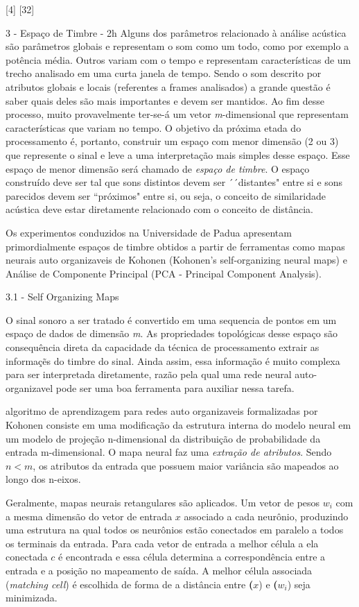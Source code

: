 [4] [32] 

3 - Espaço de Timbre - 2h
Alguns dos parâmetros relacionado à análise acústica são parâmetros globais e
representam o som como um todo, como por exemplo a potência média. Outros
variam com o tempo e representam características de um trecho analisado em uma
curta janela de tempo. Sendo o som descrito por atributos globais e locais
(referentes a frames analisados) a grande questão é saber quais deles são mais
importantes e devem ser mantidos. Ao fim desse processo, muito provavelmente
ter-se-á um vetor \textit{m}-dimensional que representam características que variam no
tempo. O objetivo da próxima etada do processamento é, portanto, construir um
espaço com menor dimensão (2 ou 3) que represente o sinal e leve a uma
interpretação mais simples desse espaço. Esse espaço de menor dimensão será
chamado de \textit{espaço de timbre}. O espaço construído deve ser tal que
sons distintos devem ser ´´distantes" entre si e sons parecidos devem ser
``próximos" entre si, ou seja, o conceito de similaridade acústica deve estar
diretamente relacionado com o conceito de distância.

Os experimentos conduzidos na Universidade de Padua apresentam primordialmente espaços de timbre obtidos a partir de ferramentas como mapas neurais auto organizaveis de Kohonen (Kohonen's self-organizing neural maps)  e Análise de Componente Principal (PCA - Principal Component Analysis).

3.1 - Self Organizing Maps

O sinal sonoro a ser tratado é convertido em uma sequencia de pontos em um espaço de dados de dimensão \textit{m}. As propriedades topológicas desse espaço são consequência direta da capacidade da técnica de processamento extrair as informaçẽs do timbre do sinal. Ainda assim, essa informação é muito complexa para ser interpretada diretamente, razão pela qual uma rede neural auto-organizavel pode ser uma boa ferramenta para auxiliar nessa tarefa.

algoritmo de aprendizagem para redes auto organizaveis formalizadas por Kohonen consiste em uma modificação da estrutura interna do modelo neural em um modelo de projeção n-dimensional da distribuição de probabilidade da entrada m-dimensional. O mapa neural faz uma \textit{extração de atributos}. Sendo $n < m$, os atributos da entrada que possuem maior variância são mapeados ao longo dos n-eixos.

Geralmente, mapas neurais retangulares são aplicados. Um vetor de pesos \textbf{$w_i$} com a mesma dimensão do vetor de entrada
\textbf{$x$} associado a cada neurônio, produzindo uma estrutura na qual todos os neurônios estão conectados em paralelo a todos os terminais da entrada. Para cada vetor de entrada a melhor célula a ela conectada \textbf{$c$} é encontrada e essa célula determina a correspondência entre a entrada e a posição no mapeamento de saída. A melhor célula associada (\textit{matching cell}) é escolhida de forma de a distância entre \textbf($x$) e \textbf($w_i$) seja minimizada. 

